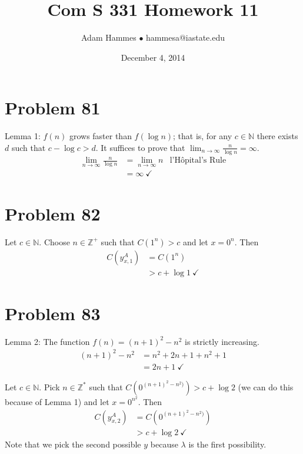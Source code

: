 \documentclass[11pt]{article}
\let\imp\rightarrow
\begin{document}
\title{Com S 331 Homework 11}
\author{Adam Hammes $\bullet$ hammesa@iastate.edu}
\date{December 4, 2014}
\maketitle


\section*{Problem 81}

Lemma 1: $f(n)$ grows faster than $f( \log n)$; that is, for any $c \in \mathbb{N}$ there exists $d$ such that $c - \log c > d$. 
It suffices to prove that $\lim _{n \imp \infty} \frac{n}{\log n}= \infty$.
	\begin{align*}
		\lim _{n \imp \infty} \frac{n}{\log n}  &= \lim _{n \imp \infty} n &\text{l'H\^{o}pital's Rule} \\
		&= \infty \ \checkmark
	\end{align*}


\section*{Problem 82}

Let $c \in \mathbb{N}$. Choose $n \in \mathbb{Z}^+$ such that $C(1^n) > c$ and let $x = 0^n$.
Then
	\begin{align*}
		C(y_{x,1} ^A) &= C(1^n) \\
		&> c + \log 1 \ \checkmark
	\end{align*}


\section*{Problem 83}

Lemma 2: The function $f(n) = (n+1)^2 - n^2$ is strictly increasing.
	\begin{align*}
		(n+1)^2 - n^2 &= n^2 + 2n + 1 + n^2 + 1 \\
		&= 2n +1 \ \checkmark
	\end{align*}

Let $c \in \mathbb{N}$.
Pick $n \in \mathbb{Z^*}$ such that $C( 0^{(n+1)^2 - n^2)}) > c + \log 2$ (we can do this because of Lemma 1) and let $x= 0^{n^2}$.
Then
	\begin{align*}
		C(y _{x, 2} ^A) &= C( 0^{(n+1)^2 - n^2)}) \\
		&> c + \log 2 \ \checkmark
	\end{align*}
Note that we pick the second possible $y$ because $\lambda$ is the first possibility.
\end{document}
